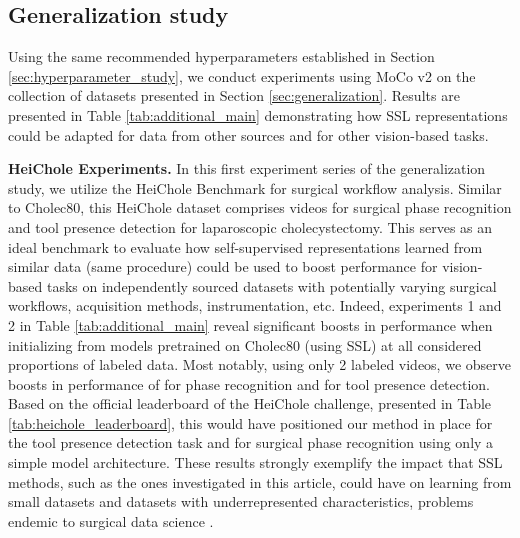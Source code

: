 \documentclass[times,twocolumn,final]{elsarticle}
\begin{document}
{\color{newtext} \subsection{Generalization study} \label{sec:results_generalization}
Using the same recommended hyperparameters established in Section \ref{sec:hyperparameter_study}, we conduct experiments using MoCo v2 on the collection of datasets presented in Section \ref{sec:generalization}. Results are presented in Table \ref{tab:additional_main} demonstrating how SSL representations could be adapted for data from other sources and for other vision-based tasks. 

\textbf{HeiChole Experiments. } In this first experiment series of the generalization study, we utilize the HeiChole Benchmark for surgical workflow analysis. 
Similar to Cholec80, this HeiChole dataset comprises videos for surgical phase recognition and tool presence detection for laparoscopic cholecystectomy. This serves as an ideal benchmark to evaluate how self-supervised representations learned from similar data (same procedure) could be used to boost performance for vision-based tasks on independently sourced datasets with potentially varying surgical workflows, acquisition methods, instrumentation, etc. Indeed, experiments 1 and 2 in Table \ref{tab:additional_main} reveal significant boosts in performance when initializing from models pretrained on Cholec80 (using SSL) at all considered proportions of labeled data. Most notably, using only 2 labeled videos, we observe boosts in performance of  for phase recognition and  for tool presence detection. Based on the official leaderboard of the HeiChole challenge, presented in Table \ref{tab:heichole_leaderboard}, this would have positioned our method in  place for the tool presence detection task and  for surgical phase recognition using only a simple model architecture. These results strongly exemplify the impact that SSL methods, such as the ones investigated in this article, could have on learning from small datasets and datasets with underrepresented characteristics, problems endemic to surgical data science \citep{sds_2}.

}
\end{document}
